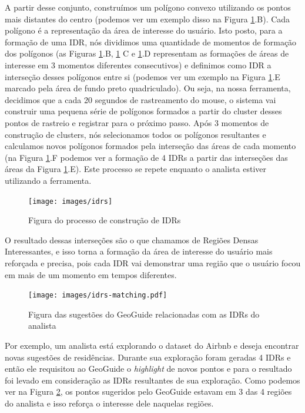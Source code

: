 A partir desse conjunto, construímos um polígono convexo utilizando os pontos mais distantes do centro (podemos ver um exemplo disso na Figura \ref{fig:idrs-geoguide}.B). Cada polígono é a representação da área de interesse do usuário. Isto posto, para a formação de uma IDR, nós dividimos uma quantidade de momentos de formação dos polígonos (as Figuras \ref{fig:idrs-geoguide}.B, \ref{fig:idrs-geoguide} C e \ref{fig:idrs-geoguide}.D representam as formações de áreas de interesse em 3 momentos diferentes consecutivos) e definimos como IDR a interseção desses polígonos entre si (podemos ver um exemplo na Figura \ref{fig:idrs-geoguide}.E marcado pela área de fundo preto quadriculado). Ou seja, na nossa ferramenta, decidimos que a cada 20 segundos de rastreamento do mouse, o sistema vai construir uma pequena série de polígonos formados a partir do cluster desses pontos de rastreio e registrar para o próximo passo. Após 3 momentos de construção de clusters, nós selecionamos todos os polígonos resultantes e calculamos novos polígonos formados pela interseção das áreas de cada momento (na Figura \ref{fig:idrs-geoguide}.F podemos ver a formação de 4 IDRs a partir das interseções das áreas da Figura \ref{fig:idrs-geoguide}.E). Este processo se repete enquanto o analista estiver utilizando a ferramenta.

\begin{figure}[t]
	\centering
	\texttt{[image: images/idrs]}
	\caption{Figura do processo de construção de IDRs}
	\label{fig:idrs-geoguide}
	\vspace{-10pt}
\end{figure}

O resultado dessas interseções são o que chamamos de Regiões Densas Interessantes, e isso torna a formação da área de interesse do usuário mais reforçada e precisa, pois cada IDR vai demonstrar uma região que o usuário focou em mais de um momento em tempos diferentes.

\begin{figure}[t]
	\centering
	\texttt{[image: images/idrs-matching.pdf]}
	\caption{Figura das sugestões do GeoGuide relacionadas com as IDRs do analista}
	\label{fig:idrs}
	\vspace{-10pt}
\end{figure}

Por exemplo, um analista está explorando o dataset do Airbnb e deseja encontrar novas sugestões de residências. Durante sua exploração foram geradas 4 IDRs e então ele requisitou ao GeoGuide o \textit{highlight} de novos pontos e para o resultado foi levado em consideração as IDRs resultantes de sua exploração. Como podemos ver na Figura \ref{fig:idrs}, os pontos sugeridos pelo GeoGuide estavam em 3 das 4 regiões do analista e isso reforça o interesse dele naquelas regiões.

